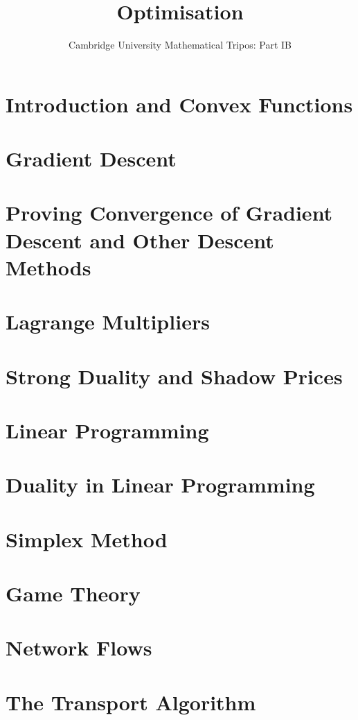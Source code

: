 \documentclass{article}
\title{Optimisation}
\author{Cambridge University Mathematical Tripos: Part IB}
\begin{document}
\maketitle

\tableofcontentsnewpage{}

\section{Introduction and Convex Functions}

\section{Gradient Descent}

\section{Proving Convergence of Gradient Descent and Other Descent Methods}

\section{Lagrange Multipliers}

\section{Strong Duality and Shadow Prices}

\section{Linear Programming}

\section{Duality in Linear Programming}

\section{Simplex Method}

\section{Game Theory}

\section{Network Flows}

\section{The Transport Algorithm}

\end{document}
